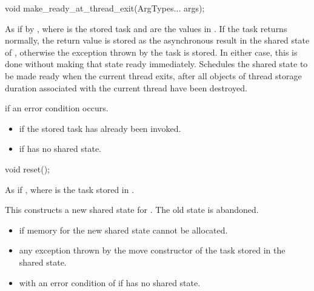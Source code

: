 %
\begin{itemdecl}
void make_ready_at_thread_exit(ArgTypes... args);
\end{itemdecl}

\begin{itemdescr}
\pnum
\effects
As if by ,
where  is the stored task and
 are the values in . If the task returns normally,
the return value is stored as the asynchronous result in the shared state of
, otherwise the exception thrown by the task is stored. In either
case, this is done without making that state ready immediately. Schedules
the shared state to be made ready when the current thread exits,
after all objects of thread storage duration associated with the current thread
have been destroyed.

\pnum
\throws
{} if an error condition occurs.

\pnum
\errors
\begin{itemize}
\item {} if the
stored task has already been invoked.
\item {} if  has no shared state.
\end{itemize}
\end{itemdescr}

%
\begin{itemdecl}
void reset();
\end{itemdecl}

\begin{itemdescr}
\pnum
\effects
As if , where
 is the task stored in
.
\begin{note}
This constructs a new shared state for . The
old state is abandoned.
\end{note}

\pnum
\throws
\begin{itemize}
\item {} if memory for the new shared state cannot be allocated.
\item any exception thrown by the move constructor of the task stored in the shared
state.
\item {} with an error condition of  if 
has no shared state.
\end{itemize}
\end{itemdescr}

